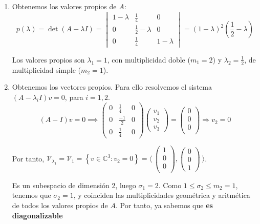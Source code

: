 \documentclass[11pt, a4paper]{article}
\newif\IfInSansMode
\numberwithin{equation}{section}
\newcommand{\la}{\lambda}
\theoremstyle{theorem-style}
\theoremstyle{definition-style}
\theoremstyle{remark-style}
\theoremstyle{example-style}
\newenvironment{nlist}
{\begin{enumerate}
    \renewcommand\labelenumi{(\emph{\roman{enumi})}}}
  {\end{enumerate}}
\begin{document}
\begin{nlist}
\item Obtenemos los valores propios de $A$:
  $$p(\la) = \det(A - \lambda I) =
  \begin{vmatrix}
    1 - \lambda & \frac{1}{4} & 0 \\
    0 & \frac{1}{2} - \lambda & 0 \\
    0 & \frac{1}{4} & 1 - \lambda
  \end{vmatrix} = (1-\lambda)^2(\frac{1}{2} - \lambda)$$

  Los valores propios son $\lambda_1 = 1$, con multiplicidad doble ($m_1 = 2$) y
  $\lambda_2 = \frac{1}{2}$, de multiplicidad simple ($m_2 = 1$).
\item Obtenemos los vectores propios. Para ello resolvemos el sistema $(A - \la_iI)v
  = 0$, para $i=1,2$.
  $$ (A - I)v = 0 \implies
  \begin{pmatrix}
    0 & \frac{1}{4} & 0 \\
    0 & \frac{-1}{2} & 0 \\
    0 & \frac{1}{4} & 0
  \end{pmatrix}
  \begin{pmatrix}
    v_1 \\
    v_2 \\
    v_3 
  \end{pmatrix} =
  \begin{pmatrix}
    0 \\
    0 \\
    0 \\
  \end{pmatrix} \Rightarrow v_2 = 0$$

  Por tanto, $\mathcal V_{\lambda_1} = \mathcal V_1 = \left\{ v \in \mathbb C^3 : v_2 = 0 \right\} = \langle \
  \begin{pmatrix}
    1 \\
    0 \\
    0 \\
  \end{pmatrix},
  \begin{pmatrix}
    0 \\
    0 \\
    1
  \end{pmatrix}\ \rangle$. 
  
  Es un subespacio de dimensión 2, luego $\sigma_1 = 2$. Como $1\le\sigma_2\le m_2 = 1$, tenemos que $\sigma_2=1$, y coinciden las multiplicidades geométrica y aritmética de todos los valores propios de $A$. Por tanto, ya sabemos que \textbf{es diagonalizable} 


\end{nlist}
\end{document}
